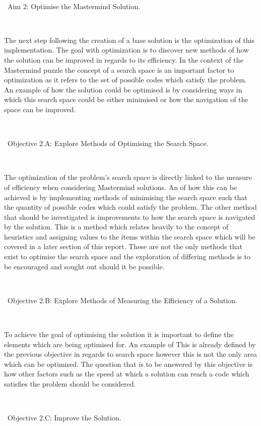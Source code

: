 \documentclass[12pt]{article}  %
\theoremstyle{definition}
\theoremstyle{remark}
\begin{document}
\

\textbullet\ Aim 2: Optimise the Mastermind Solution.

\

The next step following the creation of a base solution is the optimization of this implementation. The goal with optimization is to discover
new methods of how the solution can be improved in regards to its efficiency. In the context of the Mastermind puzzle the concept of a
search space is an important factor to optimization as it refers to the set of possible codes which satisfy the problem. An example of how
the solution could be optimised is by considering ways in which this search space could be either minimised or how the navigation of the
space can be improved.


\

\textbullet\ Objective 2.A: Explore Methods of Optimising the Search Space.

\

The optimization of the problem's search space is directly linked to the measure of efficiency when considering Mastermind solutions.
An of how this can be achieved is by implementing methods of minimising the search space such that the quantity of possible codes
which could satisfy the problem. The other method that should be investigated is improvements to how the search space
is navigated by the solution. This is a method which relates heavily to the concept of heuristics and assigning values to the items within
the search space which will be covered in a later section of this report. These are not the only methods that exist to optimise the
search space and the exploration of differing methods is to be encouraged and sought out should it be possible.

\

\textbullet\ Objective 2.B: Explore Methods of Measuring the Efficiency of a Solution.

\

To achieve the goal of optimising the solution it is important to define the elements which are being optimised for. An example of
This is already defined by the previous objective in regards to search space however this is not the only area which can be optimised.
The question that is to be answered by this objective is how other factors such as the speed at which a solution can reach a code
which satisfies the problem should be considered.


\

\textbullet\ Objective 2.C: Improve the Solution.
\end{document}
